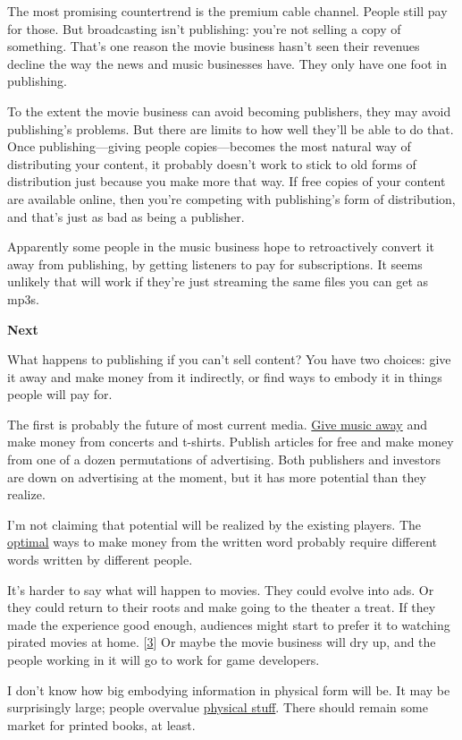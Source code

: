 The most promising countertrend is the premium cable channel. People
still pay for those. But broadcasting isn't publishing: you're not
selling a copy of something. That's one reason the movie business hasn't
seen their revenues decline the way the news and music businesses have.
They only have one foot in publishing.

To the extent the movie business can avoid becoming publishers, they may
avoid publishing's problems. But there are limits to how well they'll be
able to do that. Once publishing---giving people copies---becomes the
most natural way of distributing your content, it probably doesn't work
to stick to old forms of distribution just because you make more that
way. If free copies of your content are available online, then you're
competing with publishing's form of distribution, and that's just as bad
as being a publisher.

Apparently some people in the music business hope to retroactively
convert it away from publishing, by getting listeners to pay for
subscriptions. It seems unlikely that will work if they're just
streaming the same files you can get as mp3s.

\textbf{Next}

What happens to publishing if you can't sell content? You have two
choices: give it away and make money from it indirectly, or find ways to
embody it in things people will pay for.

The first is probably the future of most current media.
\href{http://thesixtyone.com}{Give music away} and make money from
concerts and t-shirts. Publish articles for free and make money from one
of a dozen permutations of advertising. Both publishers and investors
are down on advertising at the moment, but it has more potential than
they realize.

I'm not claiming that potential will be realized by the existing
players. The \href{http://ycombinator.com/rfs1.html}{optimal} ways to
make money from the written word probably require different words
written by different people.

It's harder to say what will happen to movies. They could evolve into
ads. Or they could return to their roots and make going to the theater a
treat. If they made the experience good enough, audiences might start to
prefer it to watching pirated movies at home. {[}\hyperref[f3n]{3}{]} Or
maybe the movie business will dry up, and the people working in it will
go to work for game developers.

I don't know how big embodying information in physical form will be. It
may be surprisingly large; people overvalue \href{stuff.html}{physical
stuff}. There should remain some market for printed books, at least.

